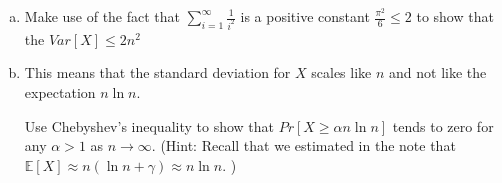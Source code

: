 \documentclass[11pt]{article}
\newif\ifsolutions
\begin{document}
\begin{enumerate}
\begin{enumerate}[a)]
\item Make use of the fact that $\sum\nolimits_{i=1}^{\infty}
  \frac{1}{i^2}$ is a positive constant $\frac{\pi^2}{6} \leq 2$ to show that the $Var[X] \leq 2n^2$ 

\ifsolutions{\color{blue}{
We use the fact that the $X_i$'s are independent, 
\begin{align*}
Var[X] &= \sum\nolimits_{i=0}^{n-1} Var[X_i] \\ 
&\leq \sum\nolimits_{i=0}^{n-1} (\frac{n}{n-i})^2 \\
&= n^2\sum\nolimits_{i=0}^{n-1} \frac{1}{i}^2 \\
&\leq n^2\sum\nolimits_{i=0}^{\infty} \frac{1}{i}^2 \\
&\leq 2n^2
\end{align*}
}}\fi

\item This means that the standard deviation for $X$ scales like $n$
  and not like the expectation $n \ln n$. 

 Use Chebyshev's inequality to show that $Pr[ X \geq \alpha n
  \ln{n}]$ tends to zero for any $\alpha > 1$ as $n \rightarrow
  \infty$. (Hint: Recall that we estimated in the note that
  $\mathbb{E}[X] \approx n(\ln{n} + \gamma) \approx n \ln{n}$. ) 

\ifsolutions{\color{blue}{ 


\begin{align*}
Pr[ X \geq \alpha n\ln{n}] &\approx Pr[ X \geq (\alpha-1)n\ln{n} + \mathbb{E}[X]] \\ 
&=  Pr[ X - \mathbb{E}[X] \geq (\alpha - 1)n\ln{n} ] \\
&\leq Pr[ | X - \mathbb{E}[X] | \geq (\alpha-1)n\ln{n} ] \\
&\leq \frac{Var[X]}{((\alpha-1)n\ln{n})^2} \\
&\leq \frac{2n^2}{((\alpha-1)^2n^2(\ln{n})^2} \\
&= \frac{2}{(\alpha-1)^2(\ln{n})^2} \\
& \lim_{n \to \infty} \frac{2}{(\alpha-1)^2(\ln{n})^2}  = 0 \\
\end{align*}
}}\fi


\end{enumerate}


\end{enumerate}
\end{document}

